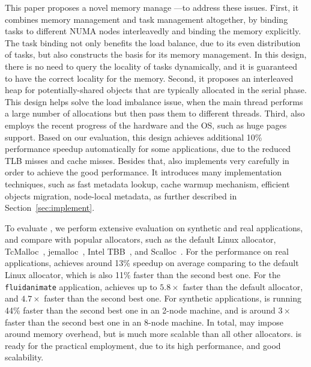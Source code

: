 This paper proposes a novel memory manage --\NM{}--to address these issues. First, it combines memory management and task management altogether, by binding tasks to different NUMA nodes interleavedly and binding the memory explicitly. The task binding not only benefits the load balance, due to its even distribution of tasks, but also constructs the basis for its memory management. In this design, there is no need to query the locality of tasks dynamically, and it is guaranteed to have the correct locality for the memory. Second, it proposes an interleaved heap for potentially-shared objects that are typically allocated in the serial phase. This design helps solve the load imbalance issue, when the main thread performs a large number of allocations but then pass them to different threads.  Third, \NM{} also employs the recent progress of the hardware and the OS, such as huge pages support. Based on our evaluation, this design achieves additional 10\% performance speedup automatically for some applications, due to the reduced TLB misses and cache misses. Besides that, \NM{} also implements very carefully in order to achieve the good performance. It introduces many implementation techniques, such as fast metadata lookup, cache warmup mechanism, efficient objects migration, node-local metadata, as further described in Section~\ref{sec:implement}. 
 



To evaluate \NM{}, we perform extensive evaluation on synthetic and real applications, and compare \NM{} with popular allocators, such as the default Linux allocator, TcMalloc~\cite{tcmalloc}, jemalloc~\cite{jemalloc}, Intel TBB~\cite{tbb}, and Scalloc~\cite{Scalloc}. For the performance on real applications, \NM{} achieves around 13\% speedup on average comparing to the default Linux allocator, which is also 11\% faster than the second best one. For the \texttt{fluidanimate} application, \NM{} achieves up to $5.8\times$ faster than the default allocator, and $4.7\times$ faster than the second best one. For synthetic applications, \NM{} is running 44\% faster than the second best one in an 2-node machine, and is around $3\times$ faster than the second best one in an 8-node machine.  In total, \NM{} may impose around  memory overhead, but is much more scalable than all other allocators.  \NM{} is ready for the practical employment, due to its high performance, and good scalability. 

